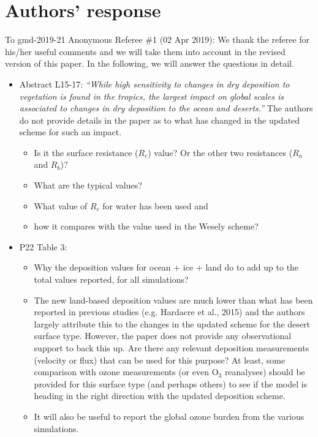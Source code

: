 \documentclass{scrartcl}
\begin{document}
\section*{Authors' response}
To gmd-2019-21 Anonymous Referee \#1 (02 Apr 2019):
We thank the referee for his/her useful comments and we will take them into account in the revised version of this paper.
In the following, we will answer the questions in detail.
\begin{itemize}
\item {\color{blue}  Abstract L15-17: \emph{“While high sensitivity to changes in dry deposition to
    vegetation is found in the tropics, the largest impact on global scales is associated to
    changes in dry deposition to the ocean and deserts.”} The authors do not provide details
  in the paper as to what has changed in the updated scheme for such an impact.
  \begin{itemize}
  \item Is it the surface resistance ($R_c$) value? Or the other two resistances ($R_a$ and $R_b$)?
  \item What are the typical values?
  \item What value of $R_c$ for water has been used and
  \item how it compares with the value used in the Wesely scheme?
  \end{itemize}
}
  \emph{}

\item {\color{blue}  P22 Table 3:}
  \begin{itemize}
  \item {\color{blue}  Why the deposition values for ocean + ice + land do to add up to the total
    values reported, for all simulations?} \emph{}
  \item {\color{blue}  The new land-based deposition values are much lower than what has
    been reported in previous studies (e.g. Hardacre et al., 2015) and the authors largely
    attribute this to the changes in the updated scheme for the desert surface type. However,
    the paper does not provide any observational support to back this up. Are there
    any relevant deposition measurements (velocity or flux) that can be used for this purpose?
    At least, some comparison with ozone measurements (or even $\mathrm{O_3}$ reanalyses)
    should be provided for this surface type (and perhaps others) to see if the model is
    heading in the right direction with the updated deposition scheme.} \emph{}
  \item {\color{blue}  It will also be useful to report the global ozone burden from the various
    simulations.}
    \emph{}
  \end{itemize}
  

\end{itemize}
\end{document}
